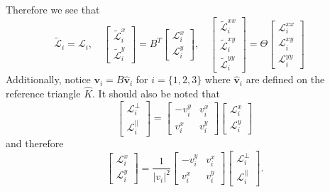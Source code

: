Therefore we see that
\begin{equation*}
  \tilde{\mathcal{L}}_i = \mathcal{L}_i, \quad
  \begin{bmatrix}
    \tilde{\mathcal{L}}^x_i \\ \tilde{\mathcal{L}}^y_i
  \end{bmatrix} = B^T \begin{bmatrix}
    \mathcal{L}^x_i \\ \mathcal{L}^y_i
  \end{bmatrix}, \quad
  \begin{bmatrix}
    \tilde{\mathcal{L}}^{xx}_i \\ \tilde{\mathcal{L}}^{xy}_i \\ \tilde{\mathcal{L}}^{yy}_i
  \end{bmatrix} = \Theta \begin{bmatrix}
    \mathcal{L}^{xx}_i \\ \mathcal{L}^{xy}_i \\ \mathcal{L}^{yy}_i
  \end{bmatrix} \quad
\end{equation*}
Additionally, notice $\mathbf{v}_i = B\hat{\mathbf{v}}_i$ for
$i=\{1,2,3\}$ where $\hat{\mathbf{v}}_i$ are defined on the reference triangle
$\hat{K}$. It should also be noted that
\begin{equation*}
  \begin{bmatrix}
    \mathcal{L}^{\perp}_i \\ \mathcal{L}^{||}_i
  \end{bmatrix} = \begin{bmatrix} -v^y_i & v^x_i \\ v^x_i & v^y_i \end{bmatrix}
  \begin{bmatrix}
    \mathcal{L}^x_i \\ \mathcal{L}^y_i
  \end{bmatrix}
\end{equation*}
and therefore
\begin{equation*}
  \begin{bmatrix}
    \mathcal{L}^{x}_i \\ \mathcal{L}^{y}_i
  \end{bmatrix} = \frac{1}{|v_i|^2}
  \begin{bmatrix} -v^y_i & v^x_i \\ v^x_i & v^y_i \end{bmatrix}
  \begin{bmatrix}
    \mathcal{L}^{\perp}_i \\ \mathcal{L}^{||}_i
  \end{bmatrix}.
\end{equation*}
